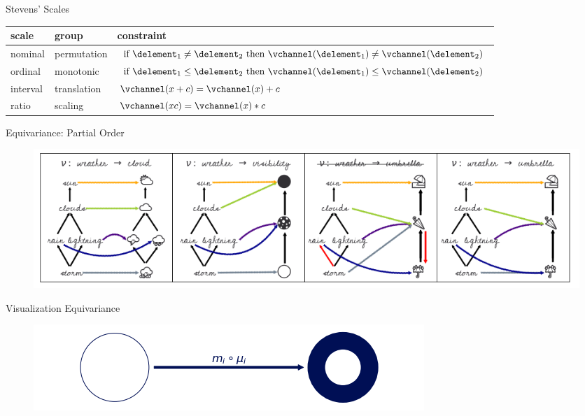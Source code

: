 \documentclass[xcolor={dvipsnames}, handout]{beamer}
\begin{document}
\begin{frame}{Stevens' Scales \cite{stevensTheoryScalesMeasurement1946}}
\begin{table}[H]
    \begin{tabularx}{\textwidth}{|l|l|X|}\toprule
        \textbf{scale} & \textbf{group} & \textbf{constraint} \\\midrule
        nominal & permutation &  $\text{if } \delement_1 \neq \delement_2 \text{ then } \vchannel (\delement_1) \neq\vchannel(\delement_2)$\\
        ordinal &  monotonic & $\text{if } \delement_1 \leq \delement_2 \text{ then } \vchannel (\delement_1) \leq \vchannel(\delement_2)$\\
        interval &  translation &  $\vchannel (x + c) = \vchannel(x) + c$ \\
        ratio &  scaling &  $\vchannel(xc) = \vchannel(x)*c $\\ \bottomrule
    \end{tabularx}
\end{table}
\end{frame}

\begin{frame}{Equivariance: Partial Order}
    \begin{figure} %
        \includegraphics[width=1\textwidth]{figures/math/monoid_equivariant.png}
    \end{figure}
\end{frame}


\begin{frame}{Visualization Equivariance}
    \begin{figure}[H]
        \includegraphics[width=\textwidth]{figures/math/diff_type_q.png}
    \end{figure}

\end{frame}
\end{document}
